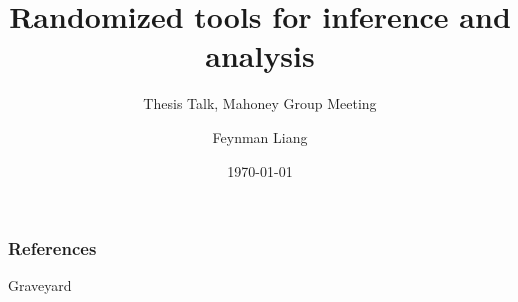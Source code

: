\documentclass[11pt]{beamer}
\title{Randomized tools for inference and analysis}
\subtitle{Thesis Talk, Mahoney Group Meeting}
\author{Feynman Liang}
\institute{UC Berkeley}
\date{\today}
\begin{document}
\begin{frame}
\titlepage
\end{frame}
















\begin{frame}[allowframebreaks]
        \frametitle{References}
        \printbibliography
\end{frame}

\appendix

\begin{frame}{Graveyard}
    
\end{frame}

\appendsubframes
\end{document}
